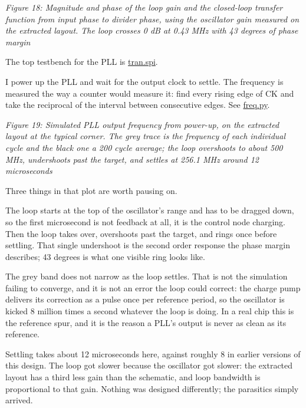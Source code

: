 {
\centering
{}
}

\emph{Figure 18: Magnitude and phase of the loop gain and the
closed-loop transfer function from input phase to divider phase, using
the oscillator gain measured on the extracted layout. The loop crosses 0
dB at 0.43 MHz with 43 degrees of phase margin}

The top testbench for the PLL is
\href{https://github.com/wulffern/sun_pll_sky130nm/blob/main/sim/SUN_PLL/tran.spi}{tran.spi}.

I power up the PLL and wait for the output clock to settle. The
frequency is measured the way a counter would measure it: find every
rising edge of CK and take the reciprocal of the interval between
consecutive edges. See
\href{https://github.com/wulffern/sun_pll_sky130nm/blob/main/sim/SUN_PLL/freq.py}{freq.py}.


{
\centering
{}
}

\emph{Figure 19: Simulated PLL output frequency from power-up, on the
extracted layout at the typical corner. The grey trace is the frequency
of each individual cycle and the black one a 200 cycle average; the loop
overshoots to about 500 MHz, undershoots past the target, and settles at
256.1 MHz around 12 microseconds}

Three things in that plot are worth pausing on.

The loop starts at the top of the oscillator's range and has to be
dragged down, so the first microsecond is not feedback at all, it is the
control node charging. Then the loop takes over, overshoots past the
target, and rings once before settling. That single undershoot is the
second order response the phase margin describes; 43 degrees is what one
visible ring looks like.

The grey band does not narrow as the loop settles. That is not the
simulation failing to converge, and it is not an error the loop could
correct: the charge pump delivers its correction as a pulse once per
reference period, so the oscillator is kicked 8 million times a second
whatever the loop is doing. In a real chip this is the reference spur,
and it is the reason a PLL's output is never as clean as its reference.

Settling takes about 12 microseconds here, against roughly 8 in earlier
versions of this design. The loop got slower because the oscillator got
slower: the extracted layout has a third less gain than the schematic,
and loop bandwidth is proportional to that gain. Nothing was designed
differently; the parasitics simply arrived.

